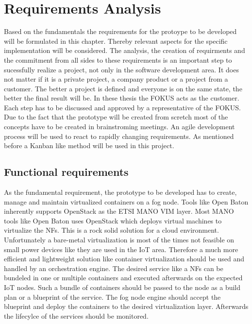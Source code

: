 \chapter{Requirements Analysis}
\label{chapter:requirements-analysis}
Based on the fundamentals the requirements for the protoype to be developed will be formulated in this chapter.
Thereby relevant aspects for the specific implementation will be considered.
The analysis, the creation of requirments and the commitment from all sides to these requirements is an important step to sucessfully realize a project, not only in the software development area.
It does not matter if it is a private project, a company product or a project from a customer.
The better a project is defined and everyone is on the same state, the better the final result will be.
In these thesis the \ac{FOKUS} acts as the customer.
Each step has to be discussed and approved by a representative of the \ac{FOKUS}.
Due to the fact that the prototype will be created from scretch most of the concepts have to be created in brainstroming meetings.
An agile development process will be used to react to rapidly changing requirements.
As mentioned before a Kanban like method will be used in this project.


\section{Functional requirements}
\label{section:functional-requirements}
As the fundamental requirement, the prototype to be developed has to create, manage and maintain virtualized containers on a fog node.
Tools like Open Baton inherently supports OpenStack as the \ac{ETSI} \ac{MANO} \ac{VIM} layer.
Most \ac{MANO} tools like Open Baton uses OpenStack which deploys virtual machines to virtualize the \acp{NF}.
This is a rock solid solution for a cloud environment.
Unfortunately a bare-metal virtualization is most of the times not feasible on small power devices like they are used in the \ac{IoT} area.
Therefore a much more efficient and lightweight solution like container virtualization should be used and handled by an orchestration engine.
The desired service like a \acp{NF} can be bundeled in one or multiple containers and executed afterwards on the expected \ac{IoT} nodes.
Such a bundle of containers should be passed to the node as a build plan or a blueprint of the service.
The fog node engine should accept the blueprint and deploy the containers to the desired virtualization layer.
Afterwards the lifecylce of the services should be monitored.

